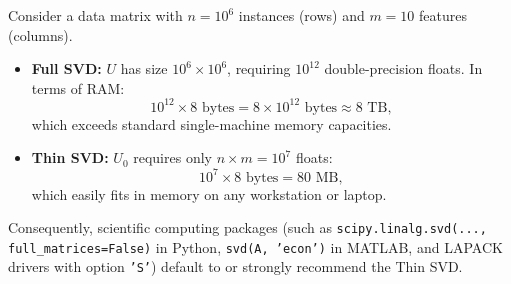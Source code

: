 \begin{table}[H]
\centering
{}
\caption{Asymptotic memory and computational complexity comparison between Full SVD and Thin SVD.}
\label{tab:svd-full-vs-thin-complexity-en}
\end{table}

\begin{example}
Consider a data matrix with $n = 10^6$ instances (rows) and $m = 10$ features (columns).
\begin{itemize}
    \item \textbf{Full SVD:} $U$ has size $10^6 \times 10^6$, requiring $10^{12}$ double-precision floats. In terms of RAM:
    \begin{equation}
        10^{12} \times 8 \text{ bytes} = 8 \times 10^{12} \text{ bytes} \approx 8 \text{ TB},
    \end{equation}
    which exceeds standard single-machine memory capacities.
    \item \textbf{Thin SVD:} $U_0$ requires only $n \times m = 10^7$ floats:
    \begin{equation}
        10^7 \times 8 \text{ bytes} = 80 \text{ MB},
    \end{equation}
    which easily fits in memory on any workstation or laptop.
\end{itemize}
Consequently, scientific computing packages (such as \texttt{scipy.linalg.svd(..., full\_matrices=False)} in Python, \texttt{svd(A, 'econ')} in MATLAB, and LAPACK drivers with option \texttt{'S'}) default to or strongly recommend the Thin SVD.
\end{example}

\FloatBarrier
